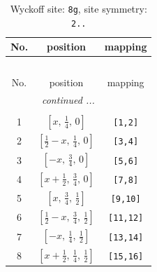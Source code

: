 \documentclass[fleqn,8pt]{jsarticle}
\begin{document}
\begin{longtable}{ccc}
\caption{Wyckoff site: {\tt 8g}, site symmetry: {\tt 2..}}
 \\
 \hline \hline
No. & position & mapping \\ \hline \endfirsthead

\multicolumn{2}{l}{\tablename\ \thetable{}} \\
 \hline \hline
No. & position & mapping \\ \hline \endhead

 \hline \hline
\multicolumn{2}{r}{\footnotesize\it continued ...} \\ \endfoot

 \hline \hline
\multicolumn{2}{r}{} \\ \endlastfoot

1 & $\left[ x,\, \frac{1}{4},\, 0 \right]$ & {\tt [1,2]} \\ \hline
2 & $\left[ \frac{1}{2} - x,\, \frac{1}{4},\, 0 \right]$ & {\tt [3,4]} \\ \hline
3 & $\left[ - x,\, \frac{3}{4},\, 0 \right]$ & {\tt [5,6]} \\ \hline
4 & $\left[ x + \frac{1}{2},\, \frac{3}{4},\, 0 \right]$ & {\tt [7,8]} \\ \hline
5 & $\left[ x,\, \frac{3}{4},\, \frac{1}{2} \right]$ & {\tt [9,10]} \\ \hline
6 & $\left[ \frac{1}{2} - x,\, \frac{3}{4},\, \frac{1}{2} \right]$ & {\tt [11,12]} \\ \hline
7 & $\left[ - x,\, \frac{1}{4},\, \frac{1}{2} \right]$ & {\tt [13,14]} \\ \hline
8 & $\left[ x + \frac{1}{2},\, \frac{1}{4},\, \frac{1}{2} \right]$ & {\tt [15,16]} \\
\end{longtable}
\renewcommand{\arraystretch}{1.2}
\end{document}
